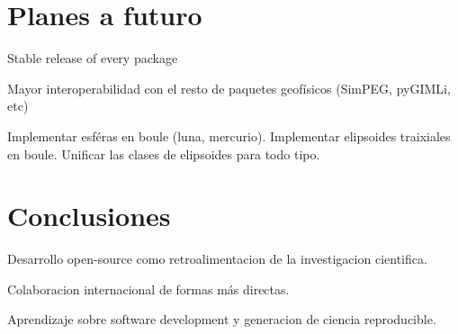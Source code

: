 \section{Planes a futuro}

Stable release of every package

Mayor interoperabilidad con el resto de paquetes geofísicos (SimPEG, pyGIMLi, etc)

Implementar esféras en boule (luna, mercurio).
Implementar elipsoides traixiales en boule.
Unificar las clases de elipsoides para todo tipo.


\section{Conclusiones}

Desarrollo open-source como retroalimentacion de la investigacion cientifica.

Colaboracion internacional de formas más directas.

Aprendizaje sobre software development y generacion de ciencia reproducible.
